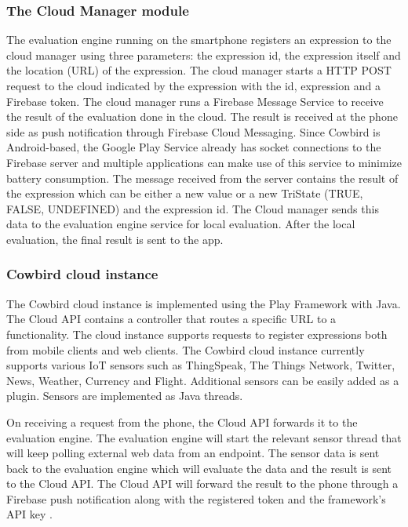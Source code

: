 \subsubsection{The Cloud Manager module}
The evaluation engine running on the smartphone registers an expression to the cloud manager using three parameters: the expression id, the expression itself and the location (URL) of the expression. The cloud manager starts a HTTP POST request to the cloud indicated by the expression with the id, expression and a Firebase token. The cloud manager runs a Firebase Message Service to receive the result of the evaluation done in the cloud. The result is received at the phone side as push notification through Firebase Cloud Messaging. 
Since Cowbird is Android-based, the Google Play Service already has socket connections to the Firebase server and multiple applications can make use of this service to minimize battery consumption. The message received from the server contains the result of the expression which can be either a new value or a new TriState (TRUE, FALSE, UNDEFINED) and the expression id. The Cloud manager sends this data to the evaluation engine service for local evaluation. After the local evaluation, the final result is sent to the app.
\subsubsection{Cowbird cloud instance}
The Cowbird cloud instance is implemented using the Play Framework \cite{playframeworkonline} with Java. The Cloud API contains a controller that routes a specific URL to a functionality. The cloud instance supports requests to register expressions both from mobile clients and web clients. The Cowbird cloud instance currently supports various IoT sensors such as ThingSpeak, The Things Network, Twitter, News, Weather, Currency and Flight. Additional sensors can be easily added as a plugin. Sensors are implemented as Java threads.

On receiving a request from the phone, the Cloud API forwards it to the evaluation engine. The evaluation engine will start the relevant sensor thread that will keep polling external web data from an endpoint. The sensor data is sent back to the evaluation engine which will evaluate the data and the result is sent to the Cloud API. The Cloud API will forward the result to the phone through a Firebase push notification along with the registered token and the framework’s API key \cite{cowbirdarticle}.
